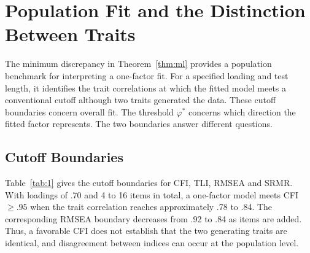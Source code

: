 \section{Population Fit and the Distinction Between Traits}
\label{sec:fit-indices}

The minimum discrepancy in Theorem~\ref{thm:ml} provides a population benchmark for interpreting a one-factor fit. For a specified loading and test length, it identifies the trait correlations at which the fitted model meets a conventional cutoff although two traits generated the data. These cutoff boundaries concern overall fit. The threshold $\varphi^*$ concerns which direction the fitted factor represents. The two boundaries answer different questions.

\subsection{Cutoff Boundaries}

Table~\ref{tab:1} gives the cutoff boundaries for CFI, TLI, RMSEA and SRMR. With loadings of .70 and 4 to 16 items in total, a one-factor model meets CFI $\ge .95$ when the trait correlation reaches approximately .78 to .84. The corresponding RMSEA boundary decreases from .92 to .84 as items are added. Thus, a favorable CFI does not establish that the two generating traits are identical, and disagreement between indices can occur at the population level.

